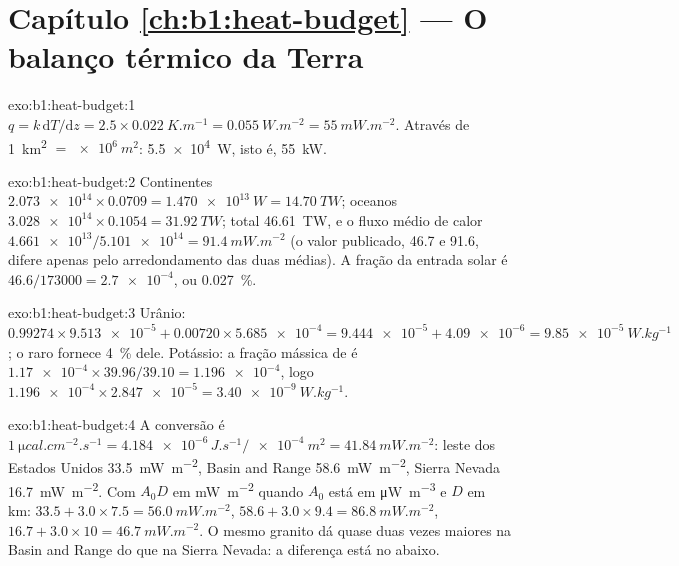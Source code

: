 \section*{Capítulo \ref{ch:b1:heat-budget} --- O balanço térmico da Terra}

\begin{solution}{exo:b1:heat-budget:1}
$q = k\,\mathrm dT/\mathrm dz = 2.5\times\qty{0.022}{K.m^{-1}} =
\qty{0.055}{W.m^{-2}} = \qty{55}{mW.m^{-2}}$. Através de \qty{1}{km^2} $=
\qty{e6}{m^2}$: \qty{5.5e4}{W}, isto é, \qty{55}{kW}.
\end{solution}

\begin{solution}{exo:b1:heat-budget:2}
Continentes $\num{2.073e14}\times0.0709 = \qty{1.470e13}{W} = \qty{14.70}{TW}$;
oceanos $\num{3.028e14}\times0.1054 = \qty{31.92}{TW}$; total \qty{46.61}{TW}, e
o fluxo médio de calor $\num{4.661e13}/\num{5.101e14} = \qty{91.4}{mW.m^{-2}}$ (o
valor publicado, 46.7 e 91.6, difere apenas pelo arredondamento das duas médias). A
fração da entrada solar é $46.6/173000 = \num{2.7e-4}$, ou
\qty{0.027}{\percent}.
\end{solution}

\begin{solution}{exo:b1:heat-budget:3}
Urânio: $0.99274\times\num{9.513e-5} + 0.00720\times\num{5.685e-4} =
\num{9.444e-5} + \num{4.09e-6} = \qty{9.85e-5}{W.kg^{-1}}$; o raro
 fornece \qty{4}{\percent} dele. Potássio: a fração mássica de
 é $\num{1.17e-4}\times39.96/39.10 = \num{1.196e-4}$, logo
$\num{1.196e-4}\times\num{2.847e-5} = \qty{3.40e-9}{W.kg^{-1}}$.
\end{solution}

\begin{solution}{exo:b1:heat-budget:4}
A conversão é $\qty{1}{\micro cal.cm^{-2}.s^{-1}} = \num{4.184e-6}\,\unit{J.s^{-1}}/\qty{e-4}{m^2}
= \qty{41.84}{mW.m^{-2}}$: leste dos Estados Unidos \qty{33.5}{mW.m^{-2}}, Basin and
Range \qty{58.6}{mW.m^{-2}}, Sierra Nevada \qty{16.7}{mW.m^{-2}}. Com $A_0D$ em
\unit{mW.m^{-2}} quando $A_0$ está em \unit{\micro W.m^{-3}} e $D$ em \unit{km}:
$33.5 + 3.0\times7.5 = \qty{56.0}{mW.m^{-2}}$, $58.6 + 3.0\times9.4 =
\qty{86.8}{mW.m^{-2}}$, $16.7 + 3.0\times10 = \qty{46.7}{mW.m^{-2}}$. O mesmo
granito dá  quase duas vezes maiores na Basin and Range do que na
Sierra Nevada: a diferença está no  abaixo.
\end{solution}

